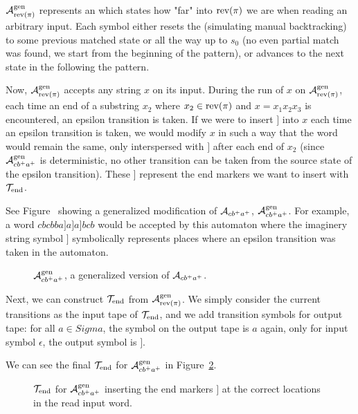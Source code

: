 $\mathcal{A}^{\text{gen}}_{\text{rev(}\pi\text{)}}$ represents an \dfa which states how "far" into $\text{rev(}\pi\text{)}$ we are when reading an arbitrary input.
Each symbol either resets the \dfa (simulating manual backtracking) to some previous matched state or all the way up to $s_0$ (no even partial match was found, we start from the beginning of the pattern), or advances to the next state in the \dfa following the pattern.

Now, $\mathcal{A}^{\text{gen}}_{\text{rev(}\pi\text{)}}$ accepts any string $x$ on its input.
During the run of $x$ on $\mathcal{A}^{\text{gen}}_{\text{rev(}\pi\text{)}}$, each time an end of a substring $x_2$ where $x_2 \in \text{rev(}\pi\text{)}$ and $x = x_1 x_2 x_3$ is encountered, an epsilon transition is taken.
If we were to insert $]$ into $x$ each time an epsilon transition is taken, we would modify $x$ in such a way that the word would remain the same, only interspersed with $]$ after each end of $x_2$ (since $\mathcal{A}^{\text{gen}}_{cb^+a^+}$ is deterministic, no other transition can be taken from the source state of the epsilon transition).
These $]$ represent the end markers we want to insert with $\mathcal{T}_{\text{end}}$.

See Figure~\cite{fig:generalized_end_marker_dfa} showing a generalized modification of \dfa $\mathcal{A}_{cb^+a^+}$, $\mathcal{A}^{\text{gen}}_{cb^+a^+}$.
For example, a word $cbcbba]a]a]bcb$ would be accepted by this automaton where the imaginery string symbol $]$ symbolically represents places where an epsilon transition was taken in the automaton.

\begin{figure}[ht]
  \centering
  \caption{\dfa $\mathcal{A}^{\text{gen}}_{cb^+a^+}$, a generalized version of $\mathcal{A}_{cb^+a^+}$.}
  \label{fig:generalized_end_marker_dfa}
\end{figure}

Next, we can construct $\mathcal{T}_{\text{end}}$ from $\mathcal{A}^{\text{gen}}_{\text{rev(}\pi\text{)}}$.
We simply consider the current transitions as the input tape of $\mathcal{T}_{\text{end}}$,
and we add transition symbols for output tape: for all $a \in Sigma$, the  symbol on the output tape is $a$ again, only for input symbol $\epsilon$, the output symbol is $]$.

We can see the final $\mathcal{T}_{\text{end}}$ for $\mathcal{A}^{\text{gen}}_{cb^+a^+}$ in Figure~\ref{fig:generalized_end_marker_dft}.
\begin{figure}[ht]
  \centering
  \caption{\dft $\mathcal{T}_{\text{end}}$ for $\mathcal{A}^{\text{gen}}_{cb^+a^+}$ inserting the end markers $]$ at the correct locations in the read input word.}
  \label{fig:generalized_end_marker_dft}
\end{figure}

